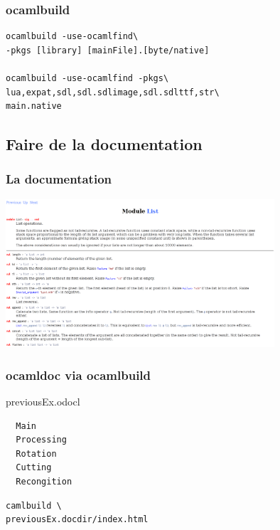 \begin{frame}[fragile]
	\frametitle{ocamlbuild}
	\begin{lstlisting}
ocamlbuild -use-ocamlfind\
-pkgs [library] [mainFile].[byte/native]

ocamlbuild -use-ocamlfind -pkgs\
lua,expat,sdl,sdl.sdlimage,sdl.sdlttf,str\
main.native
	\end{lstlisting}
\end{frame}

\subsection{Faire de la documentation} %
\begin{frame}
	\frametitle{La documentation}
	\begin{center}
		\includegraphics[width=10cm]{pics/doc.png}
	\end{center}
\end{frame}

\begin{frame}[fragile]
	\frametitle{ocamldoc via ocamlbuild}
	\begin{center}
		\begin{minipage}{0.32\textwidth}
			previousEx.odocl
			\begin{lstlisting}
  Main
  Processing
  Rotation
  Cutting
  Recongition
			\end{lstlisting}
		\end{minipage}
		\begin{minipage}{0.6\textwidth}
			\begin{lstlisting}
camlbuild \
previousEx.docdir/index.html
			\end{lstlisting}
		\end{minipage}
	\end{center}
\end{frame}

